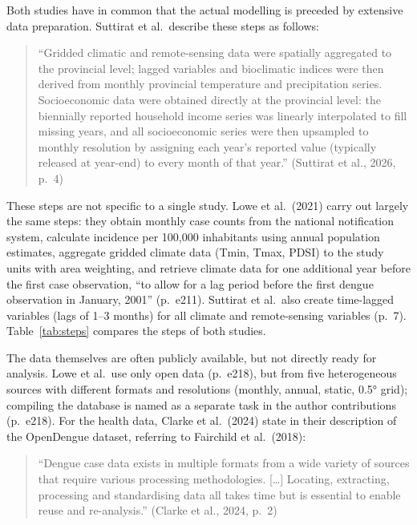 \documentclass[11pt,a4paper]{article}
\begin{document}
Both studies have in common that the actual modelling is preceded by extensive
data preparation. Suttirat et al.\ describe these steps as follows:

\begin{quote}
\enquote{Gridded climatic and remote-sensing data were spatially aggregated to
the provincial level; lagged variables and bioclimatic indices were then derived
from monthly provincial temperature and precipitation series. Socioeconomic data
were obtained directly at the provincial level: the biennially reported household
income series was linearly interpolated to fill missing years, and all
socioeconomic series were then upsampled to monthly resolution by assigning each
year's reported value (typically released at year-end) to every month of that
year.} (Suttirat et al., 2026, p.~4)
\end{quote}

These steps are not specific to a single study. Lowe et al.\ (2021) carry out
largely the same steps: they obtain monthly case counts from the national
notification system, calculate incidence per 100,000 inhabitants using annual
population estimates, aggregate gridded climate data (Tmin, Tmax, PDSI) to the
study units with area weighting, and retrieve climate data for one additional year
before the first case observation,
\enquote{to allow for a lag period before the first dengue observation in
January, 2001} (p.~e211). Suttirat et al.\ also create time-lagged variables
(lags of 1--3 months) for all climate and remote-sensing variables (p.~7).
Table~\ref{tab:steps} compares the steps of both studies.

The data themselves are often publicly available, but not directly ready for
analysis. Lowe et al.\ use only open data (p.~e218), but from five heterogeneous
sources with different formats and resolutions (monthly, annual, static, 0.5°
grid); compiling the database is named as a separate task in the author
contributions (p.~e218). For the health data, Clarke et al.\ (2024) state in
their description of the OpenDengue dataset, referring to Fairchild et al.\ (2018):

\begin{quote}
\enquote{Dengue case data exists in multiple formats from a wide variety of
sources that require various processing methodologies. [\ldots] Locating,
extracting, processing and standardising data all takes time but is essential to
enable reuse and re-analysis.} (Clarke et al., 2024, p.~2)
\end{quote}
\end{document}

